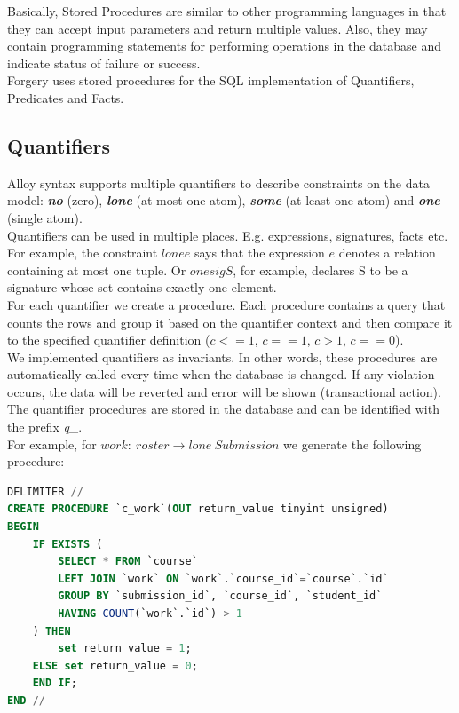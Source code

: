 \documentclass[oneside]{book}
\begin{document}
\noindent Basically, Stored Procedures are similar to other programming languages in that they can accept input parameters and return multiple values. Also, they may contain programming statements for performing operations in the database and indicate status of failure or success.\\

\noindent Forgery uses stored procedures for the SQL implementation of Quantifiers, Predicates and Facts.

\subsection{Quantifiers}
\noindent Alloy syntax supports multiple quantifiers to describe constraints on the data model: \textbf{\textit{no}} (zero), \textbf{\textit{lone}} (at most one atom), \textbf{\textit{some}} (at least one atom) and \textbf{\textit{one}} (single atom).\\

Quantifiers can be used in multiple places. E.g. expressions, signatures, facts etc.
For example, the constraint $lone e$ says that the expression $e$ denotes a relation containing at most one tuple. Or $one sig S$, for example, declares S to be a signature whose set contains exactly one element.\\

For each quantifier we create a procedure. Each procedure contains a query that counts the rows and group it based on the quantifier context and then compare it to the specified quantifier definition ($c<=1$, $c==1$, $c>1$, $c==0$).\\

We implemented quantifiers as invariants. In other words, these procedures are automatically called every time when the database is changed. If any violation occurs, the data will be reverted and error will be shown (transactional action). The quantifier procedures are stored in the database and can be identified with the prefix \textit{q\_}.\\

For example, for $work:\ roster \rightarrow lone\ Submission$ we generate the following procedure:

\begin{lstlisting}[escapechar=@,language=SQL]
DELIMITER //
CREATE PROCEDURE `c_work`(OUT return_value tinyint unsigned)
BEGIN
	IF EXISTS (
		SELECT * FROM `course`
		LEFT JOIN `work` ON `work`.`course_id`=`course`.`id`
		GROUP BY `submission_id`, `course_id`, `student_id` 
		HAVING COUNT(`work`.`id`) > 1
	) THEN
		set return_value = 1;
	ELSE set return_value = 0;
	END IF;
END //
\end{lstlisting}
\end{document}
